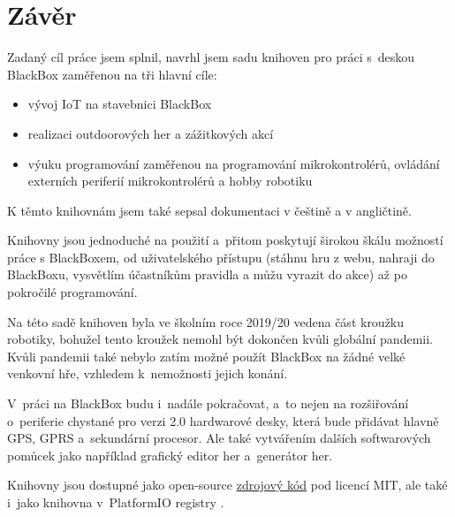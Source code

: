 \chapter{Závěr}

Zadaný cíl práce jsem splnil,
navrhl jsem sadu knihoven pro práci s~deskou BlackBox zaměřenou na tři hlavní cíle: %

\begin{itemize}[noitemsep]
	\item vývoj IoT na stavebnici BlackBox
	\item realizaci outdoorových her a zážitkových akcí
	\item výuku programování zaměřenou na programování mikrokontrolérů, ovládání externích periferií mikrokontrolérů a hobby robotiku
\end{itemize}

K těmto knihovnám jsem také sepsal dokumentaci \cite{dokumentace} v češtině a v angličtině. 

Knihovny jsou jednoduché na použití a~přitom poskytují širokou škálu možností práce s BlackBoxem, od uživatelského přístupu
(stáhnu hru z webu, nahraji do BlackBoxu, vysvětlím účastníkům pravidla a můžu vyrazit do akce) až po pokročilé programování. 

Na této sadě knihoven byla ve školním roce 2019/20 vedena část kroužku robotiky, %
bohužel tento kroužek nemohl být dokončen kvůli globální pandemii.
Kvůli pandemii také nebylo zatím možné použít BlackBox na žádné velké venkovní hře, vzhledem k~nemožnosti jejich konání.

V~práci na BlackBox budu i~nadále pokračovat, a~to nejen na rozšiřování o~periferie chystané pro verzi 2.0 hardwarové desky, 
která bude přidávat hlavně GPS, GPRS a~sekundární procesor.
Ale také vytvářením dalších softwarových pomůcek jako například grafický editor her a~generátor her.

Knihovny jsou dostupné jako open-source \href{https://github.com/RoboticsBrno/BlackBox_library}{zdrojový kód} pod licencí MIT, 
ale také i~jako knihovna v~PlatformIO registry \cite{pio-registry}.